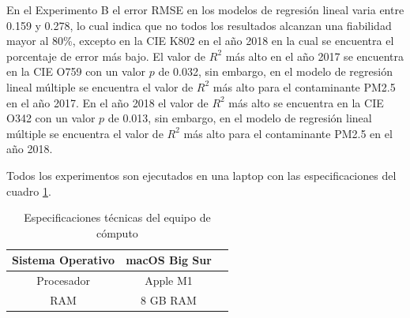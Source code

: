 En el Experimento B el error RMSE en los modelos de regresión lineal varia entre 0.159 y 0.278, lo cual indica que no todos los resultados alcanzan una fiabilidad mayor al 80\%, excepto en la CIE \citep{r9} K802 en el año 2018 en la cual se encuentra el porcentaje de error más bajo.
El valor de $R^2$ más alto en el año 2017 se encuentra en la CIE O759 con un valor $p$ de 0.032, sin embargo, en el modelo de regresión lineal múltiple se encuentra el valor de $R^2$ más alto para el contaminante PM2.5 en el año 2017. En el año 2018 el valor de $R^2$ más alto se encuentra en la CIE O342 con un valor $p$ de 0.013, sin embargo, en el modelo de regresión lineal múltiple se encuentra el valor de $R^2$ más alto para el contaminante PM2.5 en el año 2018.

\clearpage
Todos los experimentos son ejecutados en una laptop con las especificaciones del cuadro \ref{tab:Especificaciones técnicas del PC}.
\begin{table}[H]
	{\centering
		\caption{Especificaciones técnicas del equipo de cómputo}
		\begin{tabular}{|c|c|c|}
			\hline
			Sistema Operativo & macOS Big Sur\\
			\hline
			Procesador & Apple M1\\
			\hline
			RAM & 8 GB RAM\\
			\hline
		\end{tabular}

	\label{tab:Especificaciones técnicas del PC}
	}
\end{table}


